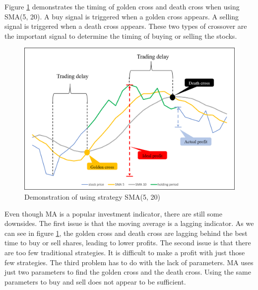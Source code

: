 \documentclass[../Proposed Method.tex]{subfiles}
\begin{document}

Figure \ref{cross_demo} demonstrates the timing of golden cross and death cross when using SMA(5, 20). A buy signal is triggered when a golden cross appears. A selling signal is triggered when a death cross appears. These two types of crossover are the important signal to determine the timing of buying or selling the stocks.

\begin{figure}[H]
    \centering
    \includegraphics[scale = 0.6] {figure/cross1.png}
    \caption{Demonstration of using strategy SMA(5, 20)}
    \label{cross_demo}
\end{figure}

Even though MA is a popular investment indicator, there are still some downsides. The first issue is that the moving average is a lagging indicator. As we can see in figure \ref{cross_demo}, the golden cross and death cross are lagging behind the best time to buy or sell shares, leading to lower profits. The second issue is that there are too few traditional strategies. It is difficult to make a profit with just those few strategies. The third problem has to do with the lack of parameters. MA uses just two parameters to find the golden cross and the death cross. Using the same parameters to buy and sell does not appear to be sufficient.
\end{document}

